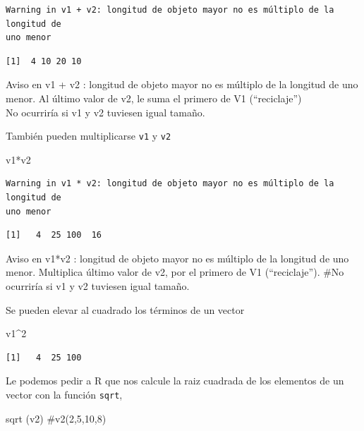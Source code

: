 \documentclass[
  letterpaper,
  DIV=11,
  numbers=noendperiod]{scrreprt}
\newenvironment{Shaded}{\begin{snugshade}}{\end{snugshade}}
\newcommand{\CommentTok}[1]{\textcolor[rgb]{0.37,0.37,0.37}{#1}}
\newcommand{\DecValTok}[1]{\textcolor[rgb]{0.68,0.00,0.00}{#1}}
\newcommand{\FunctionTok}[1]{\textcolor[rgb]{0.28,0.35,0.67}{#1}}
\newcommand{\NormalTok}[1]{\textcolor[rgb]{0.00,0.23,0.31}{#1}}
\newcommand{\SpecialCharTok}[1]{\textcolor[rgb]{0.37,0.37,0.37}{#1}}
\begin{document}
\begin{verbatim}
Warning in v1 + v2: longitud de objeto mayor no es múltiplo de la longitud de
uno menor
\end{verbatim}

\begin{verbatim}
[1]  4 10 20 10
\end{verbatim}

Aviso en v1 + v2 : longitud de objeto mayor no es múltiplo de la
longitud de uno menor. Al último valor de v2, le suma el primero de V1
(``reciclaje'')\\
No ocurriría si v1 y v2 tuviesen igual tamaño.

También pueden multiplicarse \texttt{v1} y \texttt{v2}

\begin{Shaded}
\begin{Highlighting}[]
\NormalTok{v1}\SpecialCharTok{*}\NormalTok{v2}
\end{Highlighting}
\end{Shaded}

\begin{verbatim}
Warning in v1 * v2: longitud de objeto mayor no es múltiplo de la longitud de
uno menor
\end{verbatim}

\begin{verbatim}
[1]   4  25 100  16
\end{verbatim}

Aviso en v1*v2 : longitud de objeto mayor no es múltiplo de la longitud
de uno menor. Multiplica último valor de v2, por el primero de V1
(``reciclaje''). \#No ocurriría si v1 y v2 tuviesen igual tamaño.

Se pueden elevar al cuadrado los términos de un vector

\begin{Shaded}
\begin{Highlighting}[]
\NormalTok{v1}\SpecialCharTok{\^{}}\DecValTok{2} 
\end{Highlighting}
\end{Shaded}

\begin{verbatim}
[1]   4  25 100
\end{verbatim}

Le podemos pedir a R que nos calcule la raiz cuadrada de los elementos
de un vector con la función \texttt{sqrt},

\begin{Shaded}
\begin{Highlighting}[]
\FunctionTok{sqrt}\NormalTok{ (v2) }\CommentTok{\#v2(2,5,10,8)}
\end{Highlighting}
\end{Shaded}
\end{document}
